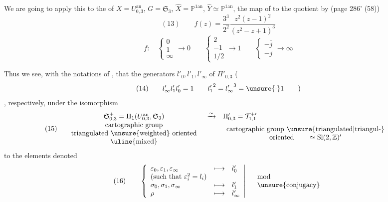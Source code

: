 We are going to apply this to the  of
$X=U_{0,3}^{\mathrm{an}}$, $G=\mathfrak{S}_3$,
$\widehat{X}=\mathbb{P}^{1\mathrm{an}}$, $\widehat{Y}\simeq\mathbb{P}^{1\mathrm{an}}$,
 the map of  to the quotient
 by (page 286' (58))
\[
(13)\qquad
f(z)=\frac{3^3}{2^2}\frac{z^2(z-1)^2}{(z^2-z+1)^3}
\]
\[
f:\quad
\left\{\begin{array}{l}0\\1\\\infty\end{array}\right.\longrightarrow 0
\qquad
\left\{\begin{array}{l}2\\-1\\1/2\end{array}\right.\longrightarrow 1
\qquad
\left\{\begin{array}{l}-\overline{j}\\-j\end{array}\right.\longrightarrow\infty
\]

Thus we see, with the notations of \hspace{3em}, that the generators
$l'_0,l'_1,l'_\infty$ of $\Pi'_{0,3}$
(
\[
(14)\qquad l'_\infty l'_1 l'_0=1
\qquad {l'_1}^{2}={l'_\infty}^{3}=\unsure{\cdot}1\qquad )
\]
, respectively, under the isomorphism
\[
(15)\quad
\begin{array}{ccl}
\mathfrak{S}_{0,3}^{+}
=\Pi_1(U_{0,3}^{\mathrm{an}},\mathfrak{S}_3)
&\xrightarrow{\sim}&\Pi'_{0,3}=\mathcal{T}_{1,1}^{+\prime}\\
\begin{array}{c}
\text{cartographic group}\\
\text{triangulated \unsure{weighted} oriented}\\
\text{\uline{mixed}}
\end{array}
&&\begin{array}{c}
\text{cartographic group \unsure{triangulated|triangul-}}\\
\text{oriented}\qquad \simeq\mathrm{Sl}(2,\mathbb{Z})'
\end{array}
\end{array}
\]
to the elements denoted
\[
(16)\qquad
\left\{\begin{array}{lll}
\varepsilon_0,\varepsilon_1,\varepsilon_\infty&\longmapsto&l'_0\\
\text{(such that $\varepsilon_i^2=l_i$)}&&\\
\sigma_0,\sigma_1,\sigma_\infty&\longmapsto&l'_1\\
\rho&\longmapsto&l'_\infty
\end{array}\right|\quad
\begin{array}{l}\mathrm{mod}\\\text{\unsure{conjugacy}}\end{array}
\]

